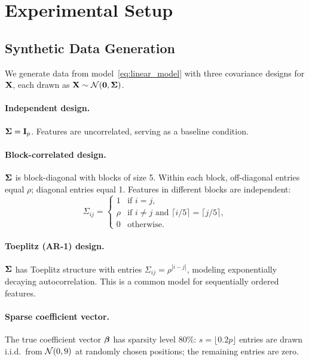 \section{Experimental Setup}
\label{sec:experimental_setup}

\subsection{Synthetic Data Generation}

We generate data from model~\eqref{eq:linear_model} with three covariance designs for $\mathbf{X}$, each drawn as $\mathbf{X} \sim \mathcal{N}(\mathbf{0}, \boldsymbol{\Sigma})$.

\paragraph{Independent design.}
$\boldsymbol{\Sigma} = \mathbf{I}_p$.
Features are uncorrelated, serving as a baseline condition.

\paragraph{Block-correlated design.}
$\boldsymbol{\Sigma}$ is block-diagonal with blocks of size 5.
Within each block, off-diagonal entries equal $\rho$; diagonal entries equal 1.
Features in different blocks are independent:
\begin{equation}
\Sigma_{ij} = \begin{cases}
1 & \text{if } i = j, \\
\rho & \text{if } i \neq j \text{ and } \lceil i/5 \rceil = \lceil j/5 \rceil, \\
0 & \text{otherwise}.
\end{cases}
\end{equation}

\paragraph{Toeplitz (AR-1) design.}
$\boldsymbol{\Sigma}$ has Toeplitz structure with entries $\Sigma_{ij} = \rho^{|i-j|}$, modeling exponentially decaying autocorrelation.
This is a common model for sequentially ordered features.

\paragraph{Sparse coefficient vector.}
The true coefficient vector $\boldsymbol{\beta}$ has sparsity level 80\%: $s = \lfloor 0.2p \rfloor$ entries are drawn i.i.d.\ from $\mathcal{N}(0, 9)$ at randomly chosen positions; the remaining entries are zero.


